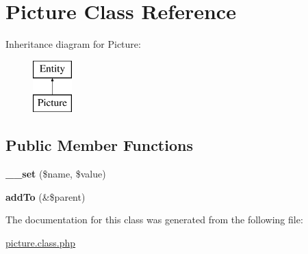 \hypertarget{classPicture}{
\section{Picture Class Reference}
\label{classPicture}
}
Inheritance diagram for Picture:\begin{figure}[H]
\begin{center}
\leavevmode
\includegraphics[height=2.000000cm]{classPicture}
\end{center}
\end{figure}
\subsection*{Public Member Functions}
\begin{DoxyCompactItemize}
\item 
\hypertarget{classPicture_a5ff28a58e5b480e851ba8bc125646670}{
{\bfseries \_\-\_\-set} (\$name, \$value)}
\label{classPicture_a5ff28a58e5b480e851ba8bc125646670}

\item 
\hypertarget{classPicture_a807f95ba4a6c3b6581ac636de88467e3}{
{\bfseries addTo} (\&\$parent)}
\label{classPicture_a807f95ba4a6c3b6581ac636de88467e3}

\end{DoxyCompactItemize}


The documentation for this class was generated from the following file:\begin{DoxyCompactItemize}
\item 
\hyperlink{picture_8class_8php}{picture.class.php}\end{DoxyCompactItemize}
